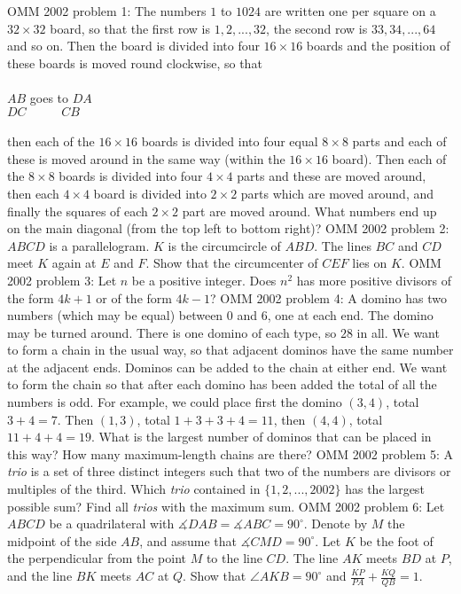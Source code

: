 OMM 2002 problem 1:  The numbers $1$ to $1024$ are written one per square on a $32 \times  32$ board, so that the first row is $1, 2, ... , 32$, the second row is $33, 34, ... , 64$ and so on. Then the board is divided into four $16 \times  16$ boards and the position of these boards is moved round clockwise, so that \\\\
$AB$ goes to $DA$ \\
$DC \,\,\,\,\,\,\,\,\,\,\,\,\,\,\,\, \,  CB$ \\\\
then each of the $16 \times  16 $ boards is divided into four equal $8 \times  8$ parts and each of these is moved around in the same way (within the $ 16 \times 16$ board). Then each of the $8 \times  8$ boards is divided into four $4 \times 4$ parts and these are moved around, then each $4 \times 4$ board is divided into $2 \times  2$ parts which are moved around, and finally the squares of each $2 \times  2$ part are moved around. What numbers end up on the main diagonal (from the top left to bottom right)? 
OMM 2002 problem 2:  $ABCD$ is a parallelogram. $K$ is the circumcircle of $ABD$. The lines $BC$ and $CD$ meet $K$ again at $E$ and $F$. Show that the circumcenter of $CEF$ lies on $K$. 
OMM 2002 problem 3:  Let $n$ be a positive integer. Does $n^2$ has more positive divisors of the form $4k+1$ or of the form $4k-1$? 
OMM 2002 problem 4:  A domino has two numbers (which may be equal) between $0$ and $6$, one at each end. The domino may be turned around. There is one domino of each type, so $28$ in all. We want to form a chain in the usual way, so that adjacent dominos have the same number at the adjacent ends. Dominos can be added to the chain at either end. We want to form the chain so that after each domino has been added the total of all the numbers is odd. For example, we could place first the domino $(3,4)$, total $3 + 4 = 7$. Then $(1,3)$, total $1 + 3 + 3 + 4 = 11$, then $(4,4)$, total $11 + 4 + 4 = 19$. What is the largest number of dominos that can be placed in this way? How many maximum-length chains are there? 
OMM 2002 problem 5:  A \textit{trio } is a set of three distinct integers such that two of the numbers are divisors or multiples of the third. Which \textit{trio } contained in $\{1, 2, ... , 2002\}$ has the largest possible sum? Find all \textit{trios } with the maximum sum. 
OMM 2002 problem 6:  Let $ABCD$ be a quadrilateral with $\measuredangle DAB=\measuredangle ABC=90^{\circ}$. Denote by $M$ the midpoint of the side $AB$, and assume that $\measuredangle CMD=90^{\circ}$. Let $K$ be the foot of the perpendicular from the point $M$ to the line $CD$. The line $AK$ meets $BD$ at $P$, and the line $BK$ meets $AC$ at $Q$. Show that $\angle{AKB}=90^{\circ}$ and $\frac{KP}{PA}+\frac{KQ}{QB}=1$. \\\\
[Moderator edit: The proposed solution can be found at http://erdos.fciencias.unam.mx/mexproblem3.pdf .] 

